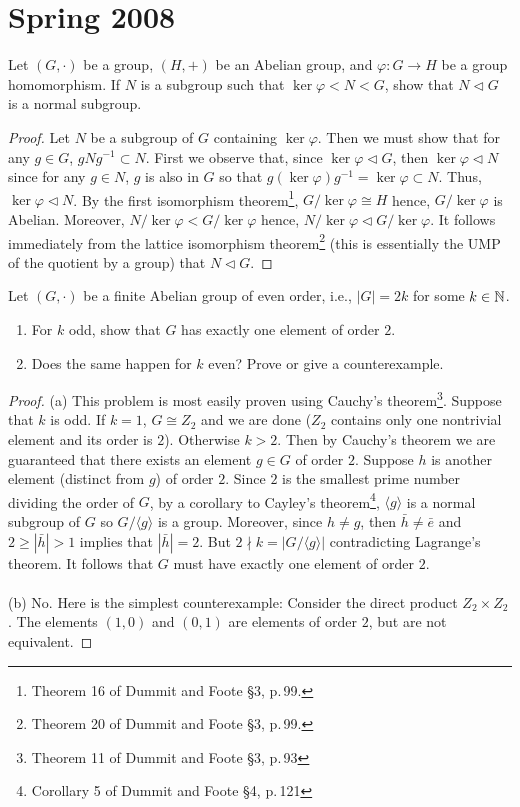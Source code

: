 \chapter{Spring 2008}
\begin{problem}
Let $(G,\cdot)$ be a group, $(H,+)$ be an Abelian group, and
$\varphi\colon G\to H$ be a group homomorphism. If $N$ is a subgroup such
that $\ker\varphi<N<G$, show that $N\lhd G$ is a normal subgroup.
\end{problem}
\begin{proof}
Let $N$ be a subgroup of $G$ containing $\ker\varphi$. Then we must show
that for any $g\in G$, $gNg^{-1}\subset N$. First we observe that, since
$\ker\varphi\lhd G$, then $\ker\varphi\lhd N$ since for any $g\in N$, $g$
is also in $G$ so that $g(\ker\varphi)g^{-1}=\ker\varphi\subset N$. Thus,
$\ker\varphi\lhd N$. By the first isomorphism theorem\footnote{Theorem 16
  of Dummit and Foote \S3, p.\,99.}, $G/\ker\varphi\cong H$ hence,
$G/\ker\varphi$ is Abelian. Moreover, $N/\ker\varphi<G/\ker\varphi$ hence,
$N/\ker\varphi\lhd G/\ker\varphi$. It follows immediately from the lattice
isomorphism theorem\footnote{Theorem 20 of Dummit and Foote \S3, p.\,99.} (this
is essentially the UMP of the quotient by a group) that $N\lhd G$.
\end{proof}
\begin{problem}
Let $(G,\cdot)$ be a finite Abelian group of even order, i.e., $|G|=2k$ for
some $k\in\mathbb{N}$.
\begin{enumerate}[noitemsep,label=(\alph*)]
\item For $k$ odd, show that $G$ has exactly one element of order $2$.
\item Does the same happen for $k$ even? Prove or give a counterexample.
\end{enumerate}
\end{problem}
\begin{proof}
(a) This problem is most easily proven using Cauchy's
theorem\footnote{Theorem 11 of Dummit and Foote \S3, p.\,93}. Suppose that
$k$ is odd. If $k=1$, $G\cong Z_2$ and we are done ($Z_2$ contains only one
nontrivial element and its order is $2$). Otherwise $k>2$. Then by Cauchy's
theorem we are guaranteed that there exists an element $g\in G$ of order
$2$. Suppose $h$ is another element (distinct from $g$) of order $2$. Since
$2$ is the smallest prime number dividing the order of $G$, by a corollary
to Cayley's theorem\footnote{Corollary 5 of Dummit and Foote \S4, p.\,121},
$\langle  g \rangle$ is a normal subgroup of $G$ so $G/\langle g \rangle$
is a group. Moreover, since $h\neq g$, then $\bar h\neq\bar e$ and
$2\geq|\bar h|>1$ implies that $|\bar h|=2$. But $2\nmid k=|G/\langle g
\rangle|$ contradicting Lagrange's theorem. It follows that $G$ must have
exactly one element of order $2$.
\\\\
(b) No. Here is the simplest counterexample: Consider the direct product
$Z_2\times Z_2$. The elements $(1,0)$ and $(0,1)$ are elements of order
$2$, but are not equivalent.
\end{proof}
